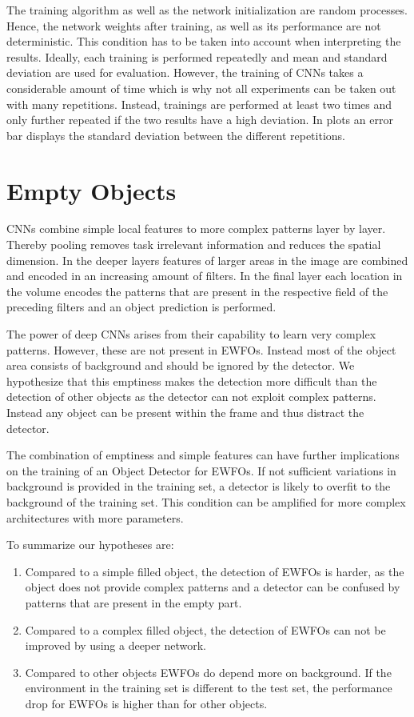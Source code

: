 The training algorithm as well as the network initialization are random processes. Hence, the network weights after training, as well as its performance are not deterministic. This condition has to be taken into account when interpreting the results. Ideally, each training is performed repeatedly and mean and standard deviation are used for evaluation. However, the training of \acp{CNN} takes a considerable amount of time which is why not all experiments can be taken out with many repetitions. Instead, trainings are performed at least two times and only further repeated if the two results have a high deviation. In plots an error bar displays the standard deviation between the different repetitions.

\section{Empty Objects}
\label{sec:empty}
\acp{CNN} combine simple local features to more complex patterns layer by layer. Thereby pooling removes task irrelevant information and reduces the spatial dimension. In the deeper layers features of larger areas in the image are combined and encoded in an increasing amount of filters. In the final layer each location in the volume encodes the patterns that are present in the respective field of the preceding filters and an object prediction is performed.

The power of deep \acp{CNN} arises from their capability to learn very complex patterns. However, these are not present in \acp{EWFO}. Instead most of the object area consists of background and should be ignored by the detector. We hypothesize that this emptiness makes the detection more difficult than the detection of other objects as the detector can not exploit complex patterns. Instead any object can be present within the frame and thus distract the detector.

The combination of emptiness and simple features can have further implications on the training of an Object Detector for \acp{EWFO}. If not sufficient variations in background is provided in the training set, a detector is likely to overfit to the background of the training set. This condition can be amplified for more complex architectures with more parameters.

To summarize our hypotheses are:
\begin{enumerate}
	\item Compared to a simple filled object, the detection of \acp{EWFO} is harder, as the object does not provide complex patterns and a detector can be confused by patterns that are present in the empty part. 
	\item Compared to a complex filled object, the detection of \acp{EWFO} can not be improved by using a deeper network.
	\item Compared to other objects \acp{EWFO} do depend more on background. If the environment in the training set is different to the test set, the performance drop for \acp{EWFO} is higher than for other objects. 
\end{enumerate}

